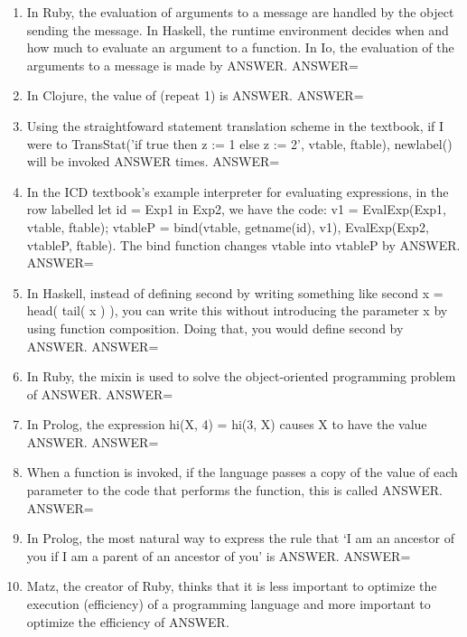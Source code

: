 \documentclass{exam}
\begin{document}
\begin{enumerate}
\item In Ruby, the evaluation of arguments to a message are handled by the object sending the message.  In Haskell, the runtime environment decides when and how much to evaluate an argument to a function.  In Io, the evaluation of the arguments to a message is made by ANSWER.\newline
ANSWER=
\item In Clojure, the value of (repeat 1) is ANSWER.\newline
ANSWER=
\item Using the straightfoward statement translation scheme in the textbook, if I were to TransStat('if true then z := 1 else z := 2', vtable, ftable), newlabel() will be invoked ANSWER times.\newline
ANSWER=
\item In the ICD textbook's example interpreter for evaluating expressions, in the row labelled let id = Exp1 in Exp2, we have the code: v1 = EvalExp(Exp1, vtable, ftable); vtableP = bind(vtable, getname(id), v1), EvalExp(Exp2, vtableP, ftable).  The bind function changes vtable into vtableP by ANSWER.\newline
ANSWER=
\item In Haskell, instead of defining second by writing something like second x = head( tail(  x ) ), you can write this without introducing the parameter x by using function composition.  Doing that, you would define second by ANSWER.\newline
ANSWER=
\item In Ruby, the mixin is used to solve the object-oriented programming problem of ANSWER.\newline
ANSWER=
\item In Prolog, the expression hi(X, 4) = hi(3, X) causes X to have the value ANSWER.\newline
ANSWER=
\item When a function is invoked, if the language passes a copy of the value of each parameter to the code that performs the function, this is called ANSWER.\newline
ANSWER=
\item In Prolog, the most natural way to express the rule that `I am an ancestor of you if I am a parent of an ancestor of you' is ANSWER.\newline
ANSWER=
\item Matz, the creator of Ruby, thinks that it is less important to optimize the execution (efficiency) of a programming language and more important to optimize the efficiency of ANSWER.\newline

\end{enumerate}
\end{document}
